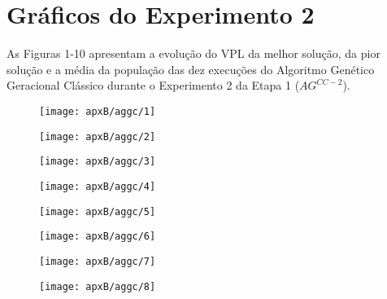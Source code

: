 \chapter{Gráficos do Experimento 2}
As Figuras 1-10 apresentam a evolução do VPL da melhor solução, da pior solução e a média da população das dez execuções do Algoritmo Genético Geracional Clássico durante o Experimento 2 da Etapa 1 ($AG^{CC-2}$).

\begin{figure}[H]
\centering

\texttt{[image: apxB/aggc/1]}

\end{figure}

\begin{figure}[H]
\centering

\texttt{[image: apxB/aggc/2]}

\end{figure}

\begin{figure}[H]
\centering

\texttt{[image: apxB/aggc/3]}

\end{figure}

\begin{figure}[H]
\centering

\texttt{[image: apxB/aggc/4]}

\end{figure}

\begin{figure}[H]
\centering

\texttt{[image: apxB/aggc/5]}

\end{figure}

\begin{figure}[H]
\centering

\texttt{[image: apxB/aggc/6]}

\end{figure}

\begin{figure}[H]
\centering

\texttt{[image: apxB/aggc/7]}

\end{figure}

\begin{figure}[H]
\centering

\texttt{[image: apxB/aggc/8]}

\end{figure}

